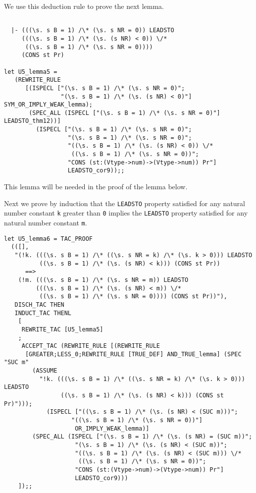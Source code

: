 We use this deduction rule to prove the next lemma.
{\footnotesize
\begin{verbatim}

  |- (((\s. s B = 1) /\* (\s. s NR = 0)) LEADSTO
     (((\s. s B = 1) /\* (\s. (s NR) < 0)) \/*
      ((\s. s B = 1) /\* (\s. s NR = 0))))
     (CONS st Pr)

let U5_lemma5 =
   (REWRITE_RULE
      [(ISPECL ["(\s. s B = 1) /\* (\s. s NR = 0)";
                "(\s. s B = 1) /\* (\s. (s NR) < 0)"] SYM_OR_IMPLY_WEAK_lemma);
       (SPEC_ALL (ISPECL ["(\s. s B = 1) /\* (\s. s NR = 0)"] LEADSTO_thm12))]
         (ISPECL ["(\s. s B = 1) /\* (\s. s NR = 0)";
                  "(\s. s B = 1) /\* (\s. s NR = 0)";
                  "((\s. s B = 1) /\* (\s. (s NR) < 0)) \/*
                   ((\s. s B = 1) /\* (\s. s NR = 0))";
                  "CONS (st:(Vtype->num)->(Vtype->num)) Pr"]
                  LEADSTO_cor9));;
\end{verbatim}
}

This lemma will be needed in the proof of the lemma below.

Next we prove by induction that the {\tt LEADSTO} property satisfied for
any natural number constant {\tt k} greater than {\tt 0} implies the
{\tt LEADSTO} property satisfied for any natural number constant {\tt m}.
{\footnotesize
\begin{verbatim}
let U5_lemma6 = TAC_PROOF
  (([],
   "(!k. (((\s. s B = 1) /\* ((\s. s NR = k) /\* (\s. k > 0))) LEADSTO
          ((\s. s B = 1) /\* (\s. (s NR) < k))) (CONS st Pr))
      ==>
    (!m. (((\s. s B = 1) /\* (\s. s NR = m)) LEADSTO
         (((\s. s B = 1) /\* (\s. (s NR) < m)) \/*
          ((\s. s B = 1) /\* (\s. s NR = 0)))) (CONS st Pr))"),
   DISCH_TAC THEN
   INDUCT_TAC THENL
    [
     REWRITE_TAC [U5_lemma5]
    ;
     ACCEPT_TAC (REWRITE_RULE [(REWRITE_RULE
      [GREATER;LESS_0;REWRITE_RULE [TRUE_DEF] AND_TRUE_lemma] (SPEC "SUC m"
        (ASSUME
          "!k. (((\s. s B = 1) /\* ((\s. s NR = k) /\* (\s. k > 0))) LEADSTO
                ((\s. s B = 1) /\* (\s. (s NR) < k))) (CONS st Pr)")));
            (ISPECL ["((\s. s B = 1) /\* (\s. (s NR) < (SUC m)))";
                   "((\s. s B = 1) /\* (\s. s NR = 0))"]
                    OR_IMPLY_WEAK_lemma)]
        (SPEC_ALL (ISPECL ["(\s. s B = 1) /\* (\s. (s NR) = (SUC m))";
                    "(\s. s B = 1) /\* (\s. (s NR) < (SUC m))";
                    "((\s. s B = 1) /\* (\s. (s NR) < (SUC m))) \/*
                     ((\s. s B = 1) /\* (\s. s NR = 0))";
                    "CONS (st:(Vtype->num)->(Vtype->num)) Pr"]
                    LEADSTO_cor9)))
    ]);;
\end{verbatim}
}

